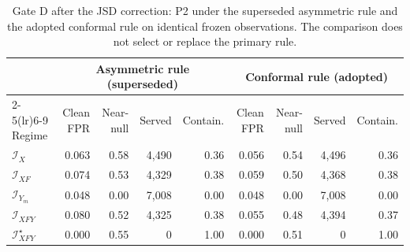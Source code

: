 \begin{table}[!tbp]
\caption{Gate D after the JSD correction: P2 under the superseded asymmetric rule and the adopted conformal rule on identical frozen observations. The comparison does not select or replace the primary rule.}
\label{tab:s-policy-rule-comparison}
\centering\scriptsize\setlength{\tabcolsep}{4pt}
\begin{tabular}{@{}lrrrrrrrr@{}}
\toprule
 & \multicolumn{4}{c}{Asymmetric rule (superseded)} & \multicolumn{4}{c}{Conformal rule (adopted)} \\
\cmidrule(lr){2-5}\cmidrule(lr){6-9}
Regime & Clean FPR & Near-null & Served & Contain. & Clean FPR & Near-null & Served & Contain. \\
\midrule
$\mathcal I_X$ & 0.063 & 0.58 & 4,490 & 0.36 & 0.056 & 0.54 & 4,496 & 0.36 \\
$\mathcal I_{XF}$ & 0.074 & 0.53 & 4,329 & 0.38 & 0.059 & 0.50 & 4,368 & 0.38 \\
$\mathcal I_{Y_m}$ & 0.048 & 0.00 & 7,008 & 0.00 & 0.048 & 0.00 & 7,008 & 0.00 \\
$\mathcal I_{XFY}$ & 0.080 & 0.52 & 4,325 & 0.38 & 0.055 & 0.48 & 4,394 & 0.37 \\
$\mathcal I_{XFY}^{\star}$ & 0.000 & 0.55 & 0 & 1.00 & 0.000 & 0.51 & 0 & 1.00 \\
\bottomrule
\end{tabular}
\end{table}
